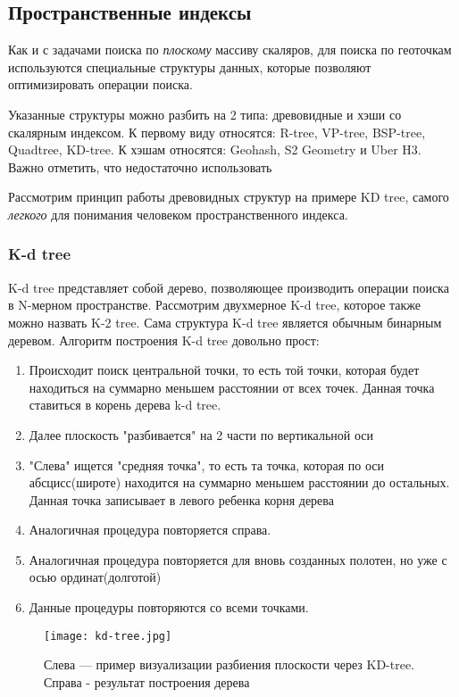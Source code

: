 
\subsection{Пространственные индексы}
Как и с задачами поиска по \textit{плоскому} массиву скаляров, для поиска по геоточкам используются специальные структуры данных, которые позволяют оптимизировать операции поиска.

Указанные структуры можно разбить на 2 типа: древовидные и хэши со скалярным индексом. К первому виду относятся: R-tree, VP-tree, BSP-tree, Quadtree, KD-tree. К хэшам относятся: Geohash, S2 Geometry и Uber H3. Важно отметить, что недостаточно использовать

Рассмотрим принцип работы древовидных структур на примере KD tree, самого \textit{легкого} для понимания человеком пространственного индекса.

\subsubsection{K-d tree}
K-d tree представляет собой дерево, позволяющее производить операции поиска в N-мерном пространстве. Рассмотрим двухмерное K-d tree, которое также можно назвать K-2 tree.
Сама структура K-d tree является обычным бинарным деревом.
Алгоритм построения K-d tree довольно прост:
\begin{enumerate}
    \item Происходит поиск центральной точки, то есть той точки, которая будет находиться на суммарно меньшем расстоянии от всех точек. Данная точка ставиться в корень дерева k-d tree.
    \item Далее плоскость "разбивается" на 2 части по вертикальной оси
    \item "Слева" ищется "средняя точка", то есть та точка, которая по оси абсцисс(широте) находится на суммарно меньшем расстоянии до остальных. Данная точка записывает в левого ребенка корня дерева
    \item Аналогичная процедура повторяется справа.
    \item Аналогичная процедура повторяется для вновь созданных полотен, но уже с осью ординат(долготой)
    \item Данные процедуры повторяются со всеми точками.
\end{enumerate}

\begin{figure}[h]
    \centering
    \texttt{[image: kd-tree.jpg]}
    \caption{Слева — пример визуализации разбиения плоскости через KD-tree. Справа - результат построения дерева}
\end{figure}

